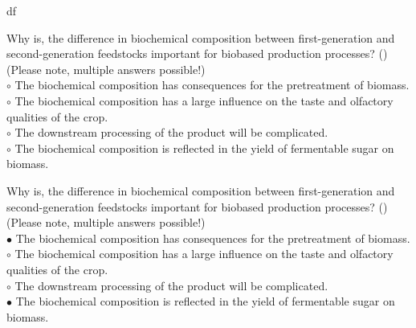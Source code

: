 df\documentclass[]{beamer}
\begin{document}
\begin{CJK}{UTF8}{gbsn}
\begin{frame}[shrink] {}
\addtocounter{questions}{1}
\color{blue}
Why is, the difference in biochemical composition between first-generation and second-generation feedstocks important for biobased production processes?
({})\\
(Please note, multiple answers possible!)
\\
\color{black}
\setlength{\parindent}{-0.4cm}
{\color{red}$\circ$}  The biochemical composition has consequences for the pretreatment  of biomass.  \\
{\color{red}$\circ$} The biochemical composition has a large influence on the taste and olfactory qualities of the crop.  \\
{\color{red}$\circ$} The downstream processing of the product will be complicated.  \\
{\color{red}$\circ$}  The biochemical composition is reflected in the yield of fermentable sugar on biomass.  \\
\end{frame}
\begin{frame}[shrink] {}
\addtocounter{answers}{1}
\color{blue}
Why is, the difference in biochemical composition between first-generation and second-generation feedstocks important for biobased production processes?
({})\\
(Please note, multiple answers possible!)
\\
\color{black}
\setlength{\parindent}{-0.4cm}
{\color{red}$\bullet$} The biochemical composition has consequences for the pretreatment  of biomass.  \\
{\color{red}$\circ$} The biochemical composition has a large influence on the taste and olfactory qualities of the crop.  \\
{\color{red}$\circ$} The downstream processing of the product will be complicated.  \\
{\color{red}$\bullet$} The biochemical composition is reflected in the yield of fermentable sugar on biomass.  \\
\end{frame}



\end{CJK}
\end{document}

